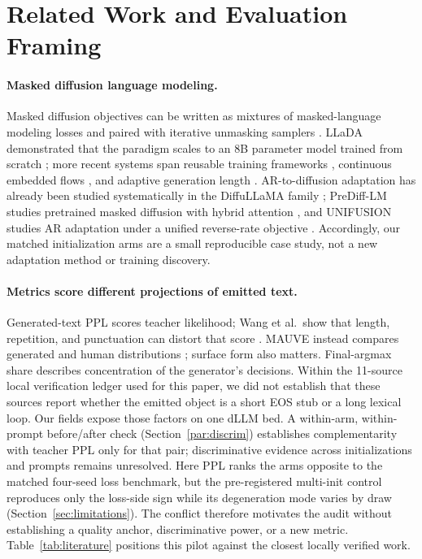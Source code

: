 \documentclass{article}
\begin{document}
\section{Related Work and Evaluation Framing}
\label{sec:related}

\paragraph{Masked diffusion language modeling.}
Masked diffusion objectives can be written as mixtures of masked-language
modeling losses and paired with iterative unmasking samplers
\citep{sahoo2024mdlm}.  LLaDA demonstrated that the paradigm scales to an 8B
parameter model trained from scratch \citep{nie2025llada}; more recent systems
span reusable training frameworks \citep{zhou2026dllm}, continuous embedded
flows \citep{hu2026elf}, and adaptive generation length
\citep{li2025daedal}.  AR-to-diffusion adaptation has already been studied
systematically in the DiffuLLaMA family \citep{gong2025adaptation}; PreDiff-LM
studies pretrained masked diffusion with hybrid attention
\citep{yao2026prediff}, and UNIFUSION studies AR adaptation under a unified
reverse-rate objective \citep{jiang2026unifusion}.  Accordingly, our matched
initialization arms are a small reproducible case study, not a new adaptation
method or training discovery.

\paragraph{Metrics score different projections of emitted text.}
Generated-text PPL scores teacher likelihood; Wang et al.\ show that length,
repetition, and punctuation can distort that score \citep{wang2022ppl}.
MAUVE instead compares generated and human distributions
\citep{pillutla2021mauve}; surface form also matters.  Final-argmax share
describes concentration of the generator's decisions.  Within the 11-source
local verification ledger used for this paper, we did not establish that these
sources report whether the emitted object is a short EOS stub or a long lexical
loop.  Our fields expose those factors on one dLLM bed.  A within-arm,
within-prompt before/after
check (Section~\ref{par:discrim}) establishes complementarity with teacher PPL
only for that pair; discriminative evidence across initializations and prompts
remains unresolved.  Here PPL ranks the arms opposite to the matched four-seed
loss benchmark, but the pre-registered multi-init control reproduces only the
loss-side sign while its degeneration mode varies by draw
(Section~\ref{sec:limitations}).  The conflict therefore motivates the audit
without establishing a quality anchor, discriminative power, or a new metric.
Table~\ref{tab:literature} positions this pilot against the closest locally
verified work.
\end{document}
